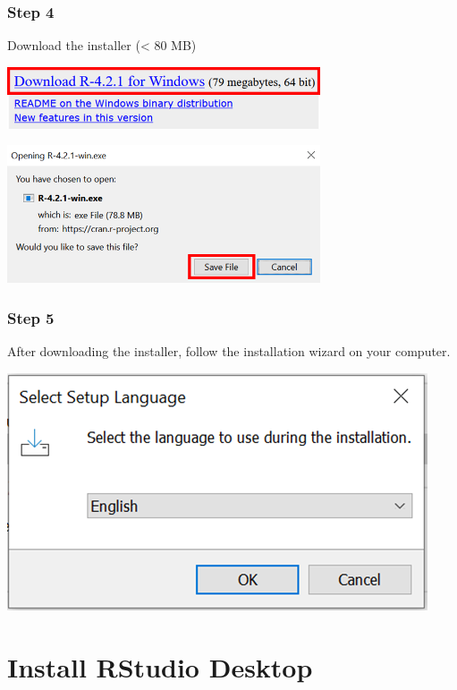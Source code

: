\documentclass[
  letterpaper,
  DIV=11,
  numbers=noendperiod]{scrreprt}
\begin{document}
\hypertarget{step-4}{%
\subsubsection{Step 4}\label{step-4}}

Download the installer (\textless{} 80 MB)

\includegraphics[width=3.64583in,height=\textheight]{./images/paste-9624855F.png}

\includegraphics[width=3.64583in,height=\textheight]{./images/paste-C42ACB10.png}

\hypertarget{step-5}{%
\subsubsection{Step 5}\label{step-5}}

After downloading the installer, follow the installation wizard on your
computer.

\includegraphics{./images/paste-0F242DBF.png}

\hypertarget{sec-RStudio-installation}{%
\section{Install RStudio Desktop}\label{sec-RStudio-installation}}
\end{document}
